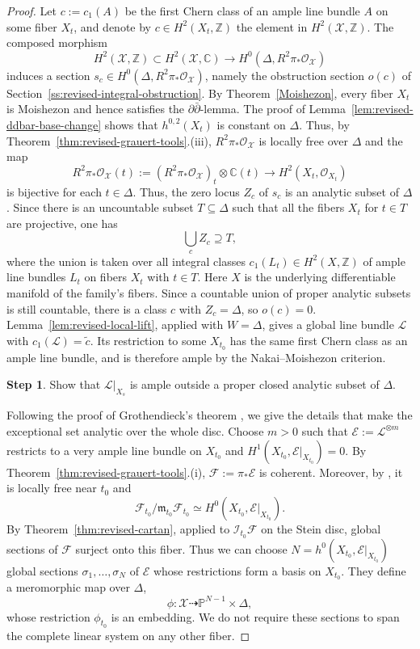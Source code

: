\documentclass[11pt]{amsart}
\numberwithin{equation}{section}
\theoremstyle{plain}
\theoremstyle{definition}
\newtheorem{step}{Step}
\newcommand{\C}{\mathbb C}
\newcommand{\Z}{\mathbb Z}
\newcommand{\cE}{\mathcal E}
\newcommand{\cF}{\mathcal F}
\newcommand{\cL}{\mathcal L}
\newcommand{\cO}{\mathcal O}
\newcommand{\cX}{\mathcal X}
\begin{document}
\begin{proof}
Let $c:=c_{1}(A)$ be the first Chern class of an ample line bundle ${A}$ on some fiber $X_{t}$, and denote by $c\in H^{2}(X_{t},\Z)$ the element in $H^2({\cX},\Z)$. The composed morphism
$$H^2({\cX},\Z)\subset H^2({\cX},\C) \to H^0(\Delta,R^2\pi_*\cO_{{\cX}})$$
induces a section $s_{c}\in H^0(\Delta,R^2\pi_*\cO_{{\cX}})$,
namely the obstruction section $o(c)$ of
Section~\ref{ss:revised-integral-obstruction}.
By Theorem~\ref{Moishezon}, every fiber $X_t$ is Moishezon and hence
satisfies the $\partial\bar\partial$-lemma.  The proof of
Lemma~\ref{lem:revised-ddbar-base-change} shows that $h^{0,2}(X_t)$
is constant on $\Delta$.  Thus, by
Theorem~\ref{thm:revised-grauert-tools}.\textup{(iii)},
$R^{2}\pi_{*}{\cO_{\cX}}$ is locally free over $\Delta$ and the map
$$R^2\pi_*\mathcal{O}_{\mathcal{X}}(t):=(R^2\pi_*\mathcal{O}_{\mathcal{X}})_t\otimes \mathbb{C}(t)\rightarrow  H^{2}(X_{t},\mathcal{O}_{{X_{t}}})$$
is bijective for each $t\in\Delta$.
Thus, the zero locus $Z_{c}$ of $s_{c}$ is an analytic subset of $\Delta$. Since there is an uncountable subset $T\subseteq  \Delta$ such that all the fibers $X_{t}$ for $t\in  T$ are projective, one has
\begin{equation*}
\bigcup_{c}Z_{c}\supseteq T,
\end{equation*}
where the union is taken over all integral classes $c_1(L_t)\in H^{2}(X,\Z)$ of ample line bundles $L_t$ on fibers $X_t$ with $t\in T$. Here $X$ is the underlying differentiable manifold of the family's fibers.
Since a countable union of proper analytic subsets is still countable,
there is a class $c$ with $Z_c=\Delta$, so $o(c)=0$.
Lemma~\ref{lem:revised-local-lift}, applied with $W=\Delta$, gives
a global line bundle $\cL$ with $c_1(\cL)=\widetilde c$.
Its restriction to some $X_{t_0}$ has the same first Chern class as an
ample line bundle, and is therefore ample by the Nakai--Moishezon
criterion.

\begin{step}\label{step42}
Show that $\cL|_{X_s}$ is ample outside a proper closed analytic subset
of $\Delta$.
\end{step} 
Following the proof of Grothendieck's theorem
\cite[Th\'eor\`eme~2.1]{Gr61}, we give the details that make the
exceptional set analytic over the whole disc.
Choose $m>0$ such that $\cE:=\cL^{\otimes m}$ restricts to a very ample
line bundle on $X_{t_0}$ and $H^1(X_{t_0},\cE|_{X_{t_0}})=0$.
By Theorem~\ref{thm:revised-grauert-tools}.\textup{(i)},
$\cF:=\pi_*\cE$ is coherent.  Moreover, by
\cite[Corollaire~1.5]{Gr61}, it is locally free near $t_0$ and
\[
 \cF_{t_0}/\mathfrak m_{t_0}\cF_{t_0}
 \simeq H^0(X_{t_0},\cE|_{X_{t_0}}).
\]
By Theorem~\ref{thm:revised-cartan}, applied to
$\mathcal I_{t_0}\cF$ on the Stein disc, global sections of $\cF$
surject onto this fiber.
Thus we can choose $N=h^0(X_{t_0},\cE|_{X_{t_0}})$ global sections
$\sigma_1,\ldots,\sigma_N$ of $\cE$ whose restrictions form a basis
on $X_{t_0}$.  They define a meromorphic map over $\Delta$,
\[
 \phi:\cX\dashrightarrow\mathbb P^{N-1}\times\Delta,
\]
whose restriction $\phi_{t_0}$ is an embedding.  We do not require these
sections to span the complete linear system on any other fiber.


\end{proof}
\end{document}
